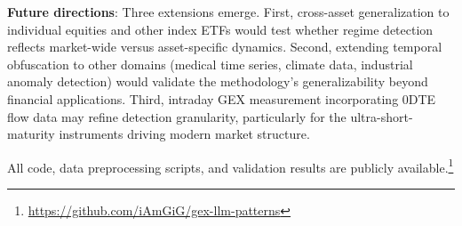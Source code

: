 \noindent\textbf{Future directions}: Three extensions emerge. First, cross-asset generalization to individual equities and other index ETFs would test whether regime detection reflects market-wide versus asset-specific dynamics. Second, extending temporal obfuscation to other domains (medical time series, climate data, industrial anomaly detection) would validate the methodology's generalizability beyond financial applications. Third, intraday GEX measurement incorporating 0DTE flow data may refine detection granularity, particularly for the ultra-short-maturity instruments driving modern market structure.

All code, data preprocessing scripts, and validation results are publicly available.\footnote{\url{https://github.com/iAmGiG/gex-llm-patterns}}
